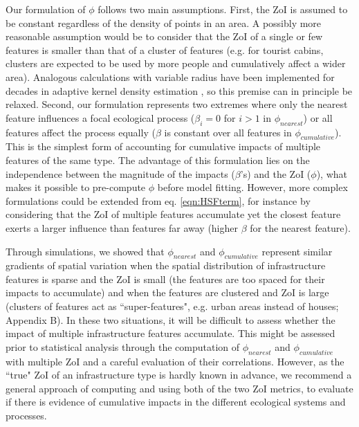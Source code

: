 \documentclass[titlepage]{article}
\begin{document}
Our formulation of $\phi$ follows two main assumptions. First, the ZoI is assumed to be constant regardless of the density of points in an area. A possibly more reasonable assumption would be to consider that the ZoI of a single or few features is smaller than that of a cluster of features (e.g. for tourist cabins, clusters are expected to be used by more people and cumulatively affect a wider area). Analogous calculations with variable radius have been implemented for decades in adaptive kernel density estimation \citep{worton_kernel_1989}, so this premise can in principle be relaxed. Second, our formulation represents two extremes where only the nearest feature influences a focal ecological process ($\beta_i = 0$ for $i > 1$ in $\phi_{nearest}$) or all features affect the process equally ($\beta$ is constant over all features in $\phi_{cumulative}$). This is the simplest form of accounting for cumulative impacts of multiple features of the same type. The advantage of this formulation lies on the independence between the magnitude of the impacts ($\beta$'s) and the ZoI ($\phi$), what makes it possible to pre-compute $\phi$ before model fitting. However, more complex formulations could be extended from eq. \ref{eqn:HSFterm}, for instance by considering that the ZoI of multiple features accumulate yet the closest feature exerts a larger influence than features far away (higher $\beta$ for the nearest feature).

Through simulations, we showed that $\phi_{nearest}$ and $\phi_{cumulative}$ represent similar gradients of spatial variation when the spatial distribution of infrastructure features is sparse and the ZoI is small (the features are too spaced for their impacts to accumulate) and when the features are clustered and ZoI is large (clusters of features act as ``super-features", e.g. urban areas instead of houses; Appendix B). In these two situations, it will be difficult to assess whether the impact of multiple infrastructure features accumulate. This might be assessed prior to statistical analysis through the computation of $\phi_{nearest}$ and $\phi_{cumulative}$ with multiple ZoI and a careful evaluation of their correlations. However, as the ``true" ZoI of an infrastructure type is hardly known in advance, we recommend a general approach of computing and using both of the two ZoI metrics, to evaluate if there is evidence of cumulative impacts in the different ecological systems and processes.
\end{document}
